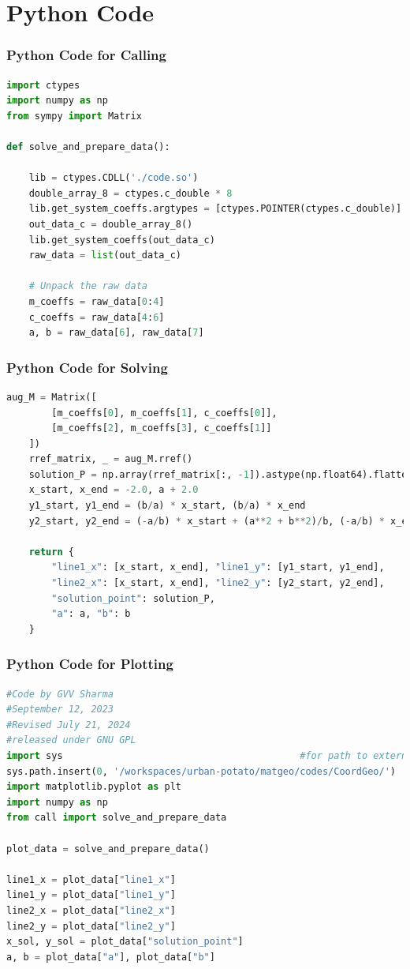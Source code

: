 \documentclass{beamer}
\theoremstyle{remark}
\numberwithin{equation}{section}
\begin{document}
\section{Python Code}
\begin{frame}[fragile]
\frametitle{Python Code for Calling}
\begin{lstlisting}[language=Python]
import ctypes
import numpy as np
from sympy import Matrix  

def solve_and_prepare_data():
    
    lib = ctypes.CDLL('./code.so')
    double_array_8 = ctypes.c_double * 8
    lib.get_system_coeffs.argtypes = [ctypes.POINTER(ctypes.c_double)]
    out_data_c = double_array_8()
    lib.get_system_coeffs(out_data_c)
    raw_data = list(out_data_c)
    
    # Unpack the raw data
    m_coeffs = raw_data[0:4]
    c_coeffs = raw_data[4:6]
    a, b = raw_data[6], raw_data[7]
\end{lstlisting}
\end{frame}
\begin{frame}[fragile]
\frametitle{Python Code for Solving}
\begin{lstlisting}[language=Python]
    aug_M = Matrix([
        [m_coeffs[0], m_coeffs[1], c_coeffs[0]],
        [m_coeffs[2], m_coeffs[3], c_coeffs[1]]
    ])
    rref_matrix, _ = aug_M.rref()
    solution_P = np.array(rref_matrix[:, -1]).astype(np.float64).flatten()
    x_start, x_end = -2.0, a + 2.0
    y1_start, y1_end = (b/a) * x_start, (b/a) * x_end
    y2_start, y2_end = (-a/b) * x_start + (a**2 + b**2)/b, (-a/b) * x_end + (a**2 + b**2)/b
  
    return {
        "line1_x": [x_start, x_end], "line1_y": [y1_start, y1_end],
        "line2_x": [x_start, x_end], "line2_y": [y2_start, y2_end],
        "solution_point": solution_P,
        "a": a, "b": b
    }
\end{lstlisting}
\end{frame}
\begin{frame}[fragile]
\frametitle{Python Code for Plotting}
\begin{lstlisting}[language=Python]
#Code by GVV Sharma
#September 12, 2023
#Revised July 21, 2024
#released under GNU GPL
import sys                                          #for path to external scripts
sys.path.insert(0, '/workspaces/urban-potato/matgeo/codes/CoordGeo/') 
import matplotlib.pyplot as plt
import numpy as np
from call import solve_and_prepare_data

plot_data = solve_and_prepare_data()

line1_x = plot_data["line1_x"]
line1_y = plot_data["line1_y"]
line2_x = plot_data["line2_x"]
line2_y = plot_data["line2_y"]
x_sol, y_sol = plot_data["solution_point"]
a, b = plot_data["a"], plot_data["b"]

\end{lstlisting}
\end{frame}
\end{document}
